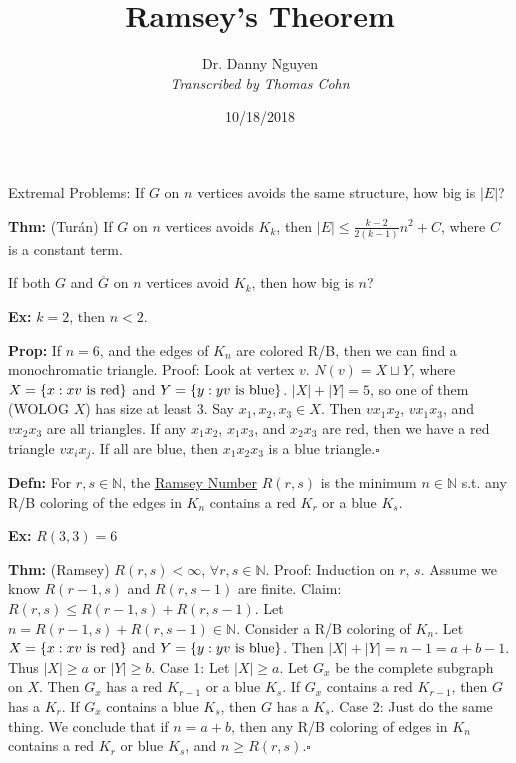\documentclass[10pt,letterpaper]{article}
\author{Dr. Danny Nguyen\\ \small\textit{Transcribed by Thomas Cohn}}
\title{Ramsey's Theorem}
\date{10/18/2018} %
\newcommand{\n}{\hfill\break}
\newcommand{\defn}[1]{\par\noindent\settowidth{\hangindent}{\textbf{Defn: }}\textbf{Defn: }#1\n}
\newcommand{\thm}[1]{\par\noindent\settowidth{\hangindent}{\textbf{Thm: }}\textbf{Thm: }#1\n}
\newcommand{\prop}[1]{\par\noindent\settowidth{\hangindent}{\textbf{Prop: }}\textbf{Prop: }#1\n}
\newcommand{\ex}[1]{\par\noindent\settowidth{\hangindent}{\textbf{Ex: }}\textbf{Ex: }#1\n}
\newcommand{\proven}{\;$\square$\n}
\newcommand{\ptxt}[1]{\textrm{\textnormal{#1}}}
\newcommand{\card}[1]{\left|#1\right|}
\newcommand{\set}[1]{\left\{#1\right\}}
\newcommand{\naturals}{\mathbb{N}}
\newcommand{\N}{\naturals}
\newcommand{\st}{s.t.}
\begin{document}
\maketitle
\setlength\RaggedRightParindent{\parindent}
\RaggedRight

\par\noindent Extremal Problems: If $G$ on $n$ vertices avoids the same structure, how big is $\card{E}$?\n

\thm{(Tur\'an) If $G$ on $n$ vertices avoids $K_{k}$, then $\card{E}\le\frac{k-2}{2(k-1)}n^{2}+C$, where $C$ is a constant term.}

\par\noindent If both $G$ and $\overline{G}$ on $n$ vertices avoid $K_{k}$, then how big is $n$?\n

\ex{$k=2$, then $n<2$.}

\prop{If $n=6$, and the edges of $K_{n}$ are colored R/B, then we can find a monochromatic triangle.\n
Proof: Look at vertex $v$. $N(v)=X\sqcup{}Y$, where $X=\set{x:xv\ptxt{ is red}}$ and $Y=\set{y:yv\ptxt{ is blue}}$.\n
$\card{X}+\card{Y}=5$, so one of them (WOLOG $X$) has size at least $3$.\n
\n
Say $x_{1},x_{2},x_{3}\in{}X$. Then $vx_{1}x_{2}$, $vx_{1}x_{3}$, and $vx_{2}x_{3}$ are all triangles. If any $x_{1}x_{2}$, $x_{1}x_{3}$, and $x_{2}x_{3}$ are red, then we have a red triangle $vx_{i}x_{j}$. If all are blue, then $x_{1}x_{2}x_{3}$ is a blue triangle.\proven}

\defn{For $r,s\in\N$, the \underline{Ramsey Number} $R(r,s)$ is the minimum $n\in\N$ \st{} any R/B coloring of the edges in $K_{n}$ contains a red $K_{r}$ or a blue $K_{s}$.}

\ex{$R(3,3)=6$}

\thm{(Ramsey) $R(r,s)<\infty$, $\forall{}r,s\in\N$.\n
Proof: Induction on $r$, $s$.\n
Assume we know $R(r-1,s)$ and $R(r,s-1)$ are finite.\n
Claim: $R(r,s)\le{}R(r-1,s)+R(r,s-1)$. Let $n=R(r-1,s)+R(r,s-1)\in\N$. Consider a R/B coloring of $K_{n}$. Let $X=\set{x:xv\ptxt{ is red}}$ and $Y=\set{y:yv\ptxt{ is blue}}$. Then $\card{X}+\card{Y}=n-1=a+b-1$. Thus $\card{X}\ge{}a$ or $\card{Y}\ge{}b$.\n
\n
Case 1: Let $\card{X}\ge{}a$. Let $G_{x}$ be the complete subgraph on $X$. Then $G_{x}$ has a red $K_{r-1}$ or a blue $K_{s}$. If $G_{x}$ contains a red $K_{r-1}$, then $G$ has a $K_{r}$. If $G_{x}$ contains a blue $K_{s}$, then $G$ has a $K_{s}$.\n
\n
Case 2: Just do the same thing.\n
\n
We conclude that if $n=a+b$, then any R/B coloring of edges in $K_{n}$ contains a red $K_{r}$ or blue $K_{s}$, and $n\ge{}R(r,s)$.\proven}
\end{document}

